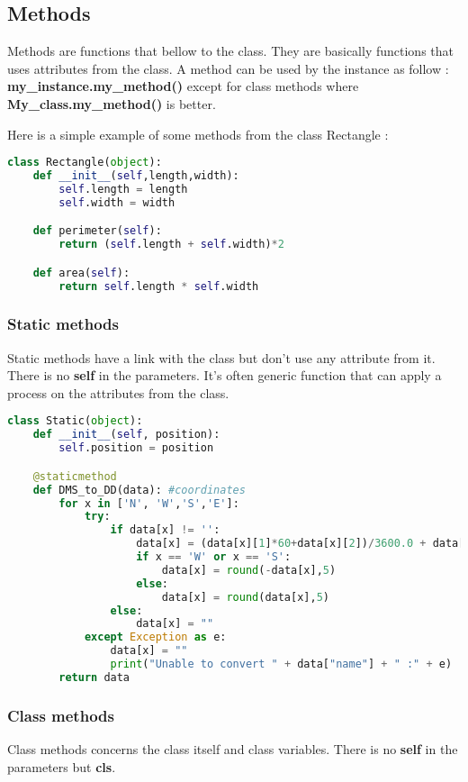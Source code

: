 \documentclass[a4paper, 12pt, titlepage]{scrartcl} %
\begin{document}
\subsection{Methods}
Methods are functions that bellow to the class. They are basically functions that uses attributes from the class. A method can be used by the instance as follow  : \textbf{my\_instance.my\_method()} except for class methods where \textbf{My\_class.my\_method()} is better.

\vspace{5mm}

Here is a simple example of some methods from the class Rectangle : 
\begin{lstlisting}[language=Python]
class Rectangle(object):
	def __init__(self,length,width):
		self.length = length
		self.width = width

	def perimeter(self):
		return (self.length + self.width)*2

	def area(self):
		return self.length * self.width
\end{lstlisting} \vspace{5mm}

\subsubsection{Static methods}
Static methods have a link with the class but don't use any attribute from it. There is no \textbf{self} in the parameters. It's often generic function that can apply a process on the attributes from the class.

\begin{lstlisting}[language=Python]
class Static(object):
	def __init__(self, position):
		self.position = position

	@staticmethod
	def DMS_to_DD(data): #coordinates
		for x in ['N', 'W','S','E']:
			try:
				if data[x] != '':
					data[x] = (data[x][1]*60+data[x][2])/3600.0 + data[x][0]
					if x == 'W' or x == 'S':
						data[x] = round(-data[x],5)
					else:
						data[x] = round(data[x],5)
				else:
					data[x] = ""
			except Exception as e:
				data[x] = ""
				print("Unable to convert " + data["name"] + " :" + e)
		return data
\end{lstlisting} \vspace{5mm}

\subsubsection{Class methods}
Class methods concerns the class itself and class variables. There is no \textbf{self} in the parameters but \textbf{cls}.
\end{document}
